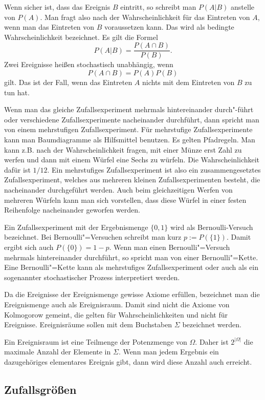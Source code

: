 \documentclass[a4paper,10pt,fleqn,twocolumn,twoside]{article}
\begin{document}
Wenn sicher ist, dass das Ereignis $B$ eintritt, so schreibt
man $P(A|B)$ anstelle von $P(A)$. Man fragt also nach der
Wahrscheinlichkeit für das Eintreten von $A$, wenn man das Eintreten
von $B$ voraussetzen kann. Das wird als bedingte Wahrscheinlichkeit
bezeichnet. Es gilt die Formel
\[P(A|B) = \frac{P(A\cap B)}{P(B)}.\]
Zwei Ereignisse heißen stochastisch unabhängig, wenn
\[P(A\cap B) = P(A)P(B)\]
gilt. Das ist der Fall, wenn das Eintreten $A$ nichts mit dem
Eintreten von $B$ zu tun hat.

Wenn man das gleiche Zufallsexperiment mehrmals hintereinander
durch"-führt oder verschiedene Zufallsexperimente nacheinander
durchführt, dann spricht man von einem mehrstufigen
Zufallsexperiment. Für mehrstufige Zufallsexperimente kann man
Baumdiagramme als Hilfsmittel benutzen. Es gelten Pfadregeln.
Man kann z.B. nach der Wahrscheinlichkeit fragen, mit einer Münze
erst Zahl zu werfen und dann mit einem Würfel eine Sechs zu würfeln.
Die Wahrscheinlichkeit dafür ist $1/12$. Ein mehrstufiges
Zufallsexperiment ist also ein zusammengesetztes Zufallsexperiment,
welches aus mehreren kleinen Zufallsexperimenten besteht, die
nacheinander durchgeführt werden. Auch beim gleichzeitigen Werfen
von mehreren Würfeln kann man sich vorstellen, dass diese Würfel
in einer festen Reihenfolge nacheinander geworfen werden.

Ein Zufallsexperiment mit der Ergebnismenge $\{0,1\}$ wird als
Bernoulli-Versuch bezeichnet. Bei Bernoulli"=Versuchen schreibt man
kurz $p:=P(\{1\})$. Damit ergibt sich auch $P(\{0\})=1-p$.
Wenn man einen Bernoulli"=Versuch mehrmals hintereinander durchführt,
so spricht man von einer Bernoulli"=Kette. Eine Bernoulli"=Kette kann
als mehrstufiges Zufallsexperiment oder auch als ein sogenannter
stochastischer Prozess interpretiert werden.

Da die Ereignisse der Ereignismenge gewisse Axiome erfüllen,
bezeichnet man die Ereignismenge auch als Ereignisraum. Damit
sind nicht die Axiome von Kolmogorow gemeint, die gelten für
Wahrscheinlichkeiten und nicht für Ereignisse. Ereignisräume
sollen mit dem Buchstaben $\Sigma$ bezeichnet werden.

Ein Ereignisraum ist eine Teilmenge der Potenzmenge von $\Omega$.
Daher ist $2^{|\Omega|}$ die maximale Anzahl der Elemente in
$\Sigma$. Wenn man jedem Ergebnis ein dazugehöriges elementares
Ereignis gibt, dann wird diese Anzahl auch erreicht.

\subsection{Zufallsgrößen}
\end{document}
